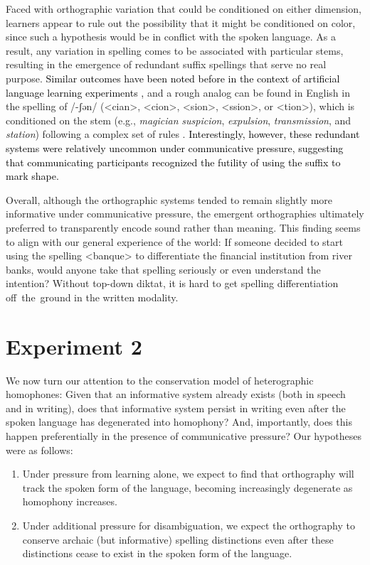\documentclass[doc,biblatex]{apa7}
\newcommand\firstrevision[1]{\textcolor{black}{#1}}
\begin{document}
Faced with orthographic variation that could be conditioned on either dimension, learners appear to rule out the possibility that it might be conditioned on color, since such a hypothesis would be in conflict with the spoken language. As a result, any variation in spelling comes to be associated with particular stems, resulting in the emergence of redundant suffix spellings that serve no real purpose. \firstrevision{Similar outcomes have been noted before in the context of artificial language learning experiments \parencite{Smith:2010},} and a rough analog can be found in English in the spelling of /-ʃən/ (<cian>, <cion>, <sion>, <ssion>, or <tion>), which is conditioned on the stem (e.g., \textit{magician} \textit{suspicion}, \textit{expulsion}, \textit{transmission}, and \textit{station}) following a complex set of rules \parencite[pp.~420--421]{Carney:1994}. \firstrevision{Interestingly, however, these redundant systems were relatively uncommon under communicative pressure, suggesting that communicating participants recognized the futility of using the suffix to mark shape.}

Overall, although the orthographic systems tended to remain slightly more informative under communicative pressure, the emergent orthographies ultimately preferred to transparently encode sound rather than meaning. This finding seems to align with our general experience of the world: If someone decided to start using the spelling <banque> to differentiate the financial institution from river banks, would anyone take that spelling seriously or even understand the intention? Without top-down diktat, it is hard to get spelling differentiation off~the~ground in the written modality.


\section{Experiment 2}

We now turn our attention to the conservation model of heterographic homophones: Given that an informative system already exists (both in speech and in writing), does that informative system persist in writing even after the spoken language has degenerated into homophony? And, importantly, does this happen preferentially in the presence of communicative pressure? Our hypotheses were as follows:
\begin{enumerate}
	\item Under pressure from learning alone, we expect to find that orthography will track the spoken form of the language, becoming increasingly degenerate as homophony increases.
	\item Under additional pressure for disambiguation, we expect the orthography to conserve archaic (but informative) spelling distinctions even after these distinctions cease to exist in the spoken form of the language.
\end{enumerate}
\end{document}
